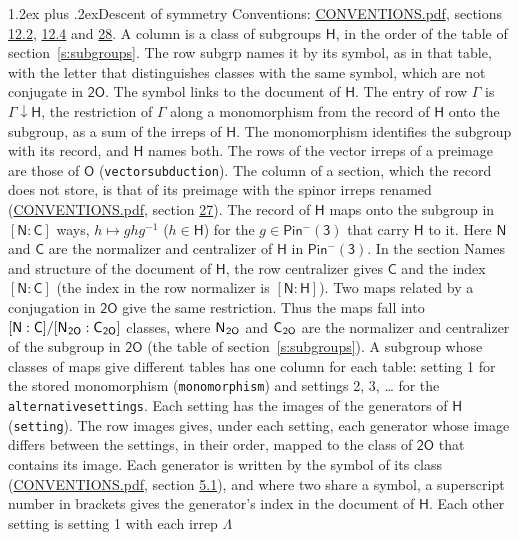\documentclass[10pt,a4paper]{article}
\makeatletter
\renewcommand\section{\@startsection{section}{1}{\z@}{-3ex plus -1ex minus -.2ex}%
  {1.2ex plus .2ex}{\normalfont\large\sffamily\bfseries\color{parttitle}}}
\numberwithin{equation}{section}
\newcommand{\grp}[1]{\mathsf{#1}}
\newcommand{\grpindex}[2]{[#1 : #2]}
\newcommand{\restr}[2]{#1\!\downarrow#2}
\newcommand{\hairsp}{\mkern1mu}
\makeatother
\begin{document}
\section{Descent of symmetry}\label{s:subduction}
Conventions: \href{../../CONVENTIONS.pdf}{CONVENTIONS.pdf}, sections \href{../../../rotation/CONVENTIONS.pdf\#conv.12.2}{12.2}, \href{../../../rotation/CONVENTIONS.pdf\#conv.12.4}{12.4} and \href{../../CONVENTIONS.pdf\#conv.28}{28}.
A column is a class of subgroups $\grp{H}$, in the order of the table of section~\ref{s:subgroups}. The row subgrp names it by its symbol, as in that table, with the letter that distinguishes classes with the same symbol, which are not conjugate in $\grp{2O}$. The symbol links to the document of $\grp{H}$. The entry of row $\Gamma$ is $\restr{\Gamma}{\grp{H}}$, the restriction of $\Gamma$ along a monomorphism from the record of $\grp{H}$ onto the subgroup, as a sum of the irreps of $\grp{H}$. The monomorphism identifies the subgroup with its record, and $\grp{H}$ names both. The rows of the vector irreps of a preimage are those of \href{../../../rotation/data/pdf/O.pdf}{$\grp{O}$} (\texttt{vectorsubduction}). The column of a section, which the record does not store, is that of its preimage with the spinor irreps renamed (\href{../../CONVENTIONS.pdf}{CONVENTIONS.pdf}, section \href{../../CONVENTIONS.pdf\#conv.27}{27}). \label{n:group.normalizer.o3}\label{n:group.centralizer.o3}\label{n:element.h}The record of $\grp{H}$ maps onto the subgroup in $\grpindex{\grp{N}}{\grp{C}}$ ways, $h \mapsto g h g^{-1}$ ($h \in \grp{H}$) for the $g \in \grp{Pin^{-}(3)}$ that carry $\grp{H}$ to it. Here $\grp{N}$ and $\grp{C}$ are the normalizer and centralizer of $\grp{H}$ in \href{Pinminus3.pdf}{$\grp{Pin^{-}(3)}$}. In the section Names and structure of the document of $\grp{H}$, the row centralizer gives $\grp{C}$ and the index $\grpindex{\grp{N}}{\grp{C}}$ (the index in the row normalizer is $\grpindex{\grp{N}}{\grp{H}}$). Two maps related by a conjugation in $\grp{2O}$ give the same restriction. Thus the maps fall into $\grpindex{\grp{N}}{\grp{C}}/\grpindex{\grp{N}_{\hairsp \grp{2O}}}{\grp{C}_{\hairsp \grp{2O}}}$ classes, where $\grp{N}_{\hairsp \grp{2O}}$ and $\grp{C}_{\hairsp \grp{2O}}$ are the normalizer and centralizer of the subgroup in $\grp{2O}$ (the table of section~\ref{s:subgroups}). \label{n:head.setting}A subgroup whose classes of maps give different tables has one column for each table: setting 1 for the stored monomorphism (\texttt{monomorphism}) and settings 2, 3, \dots{} for the \texttt{alternativesettings}. Each setting has the images of the generators of $\grp{H}$ (\texttt{setting}). \label{n:head.images}The row images gives, under each setting, each generator whose image differs between the settings, in their order, mapped to the class of $\grp{2O}$ that contains its image. \label{n:element.generator.index}Each generator is written by the symbol of its class (\href{../../CONVENTIONS.pdf}{CONVENTIONS.pdf}, section \href{../../../rotation/CONVENTIONS.pdf\#conv.5.1}{5.1}), and where two share a symbol, a superscript number in brackets gives the generator's index in the document of $\grp{H}$. \label{n:irrep.Delta}Each other setting is setting 1 with each irrep $\Lambda$ 
\end{document}
